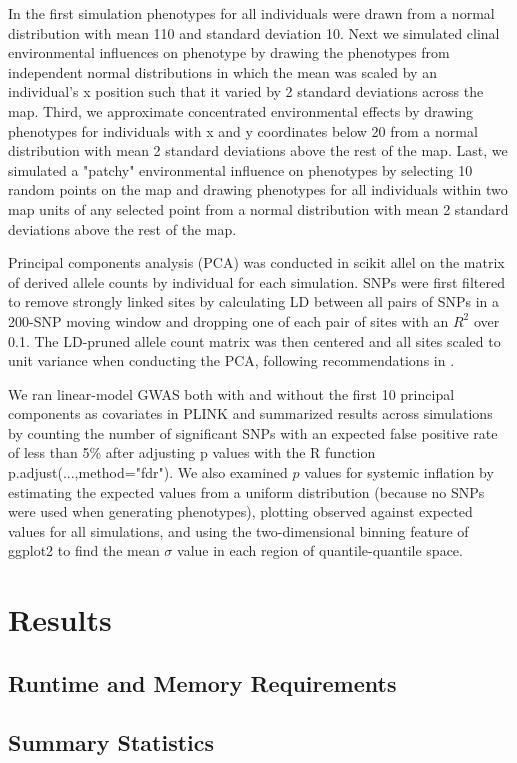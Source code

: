 \documentclass[9pt,twocolumn,twoside]{gsajnl}
\begin{document}
In the first simulation phenotypes for all individuals were drawn from a normal distribution with mean 110 and standard deviation 10. Next we simulated clinal environmental influences on phenotype by drawing the phenotypes from independent normal distributions in which the mean was scaled by an individual's x position such that it varied by 2 standard deviations across the map. Third, we approximate concentrated environmental effects by drawing phenotypes for individuals with x and y coordinates below 20 from a normal distribution with mean 2 standard deviations above the rest of the map. Last, we simulated a "patchy" environmental influence on phenotypes by selecting 10 random points on the map and drawing phenotypes for all individuals within two map units of any selected point from a normal distribution with mean 2 standard deviations above the rest of the map. 

Principal components analysis (PCA) was conducted in scikit allel on the matrix of derived allele counts by individual for each simulation. SNPs were first filtered to remove strongly linked sites by calculating LD between all pairs of SNPs in a 200-SNP moving window and dropping one of each pair of sites with an $R^2$ over 0.1. The LD-pruned allele count matrix was then centered and all sites scaled to unit variance when conducting the PCA, following recommendations in \citep{Patterson2006}.   

We ran linear-model GWAS both with and without the first 10 principal components as covariates in PLINK and summarized results across simulations by counting the number of significant SNPs with an expected false positive rate of less than 5\% after adjusting p values with the R function p.adjust(...,method="fdr"). We also examined $p$ values for systemic inflation by estimating the expected values from a uniform distribution (because no SNPs were used when generating phenotypes), plotting observed against expected values for all simulations, and using the two-dimensional binning feature of ggplot2 \citep{Wickham2016} to find the mean $\sigma$ value in each region of quantile-quantile space. 

\section{Results}
\subsection{Runtime and Memory Requirements}
\subsection{Summary Statistics}
\end{document}

